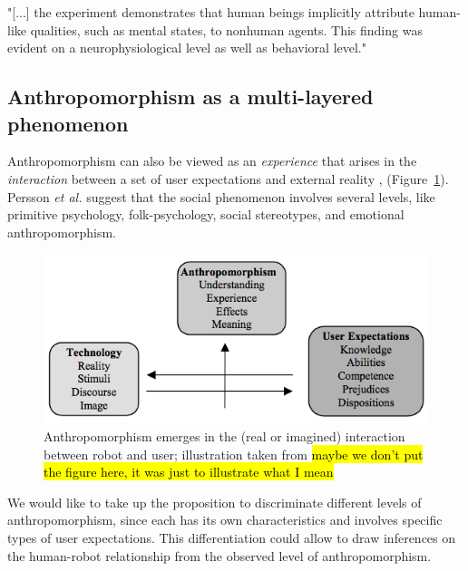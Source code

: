 \documentclass[lettersize, apacite, twoside, HRI]{apa_HRI}
\begin{document}
	

"[...] the experiment demonstrates that human beings implicitly attribute human-like qualities, such as mental states, to nonhuman agents. This finding was evident on a neurophysiological level as well as behavioral level." \cite{hegel_understanding_2008}
	


\subsection{Anthropomorphism as a multi-layered phenomenon}
\label{sec:3.4}

Anthropomorphism can also be viewed as an \textit{experience} that arises in the \textit{interaction} between a set of user expectations and external reality \cite{persson_anthropomorphism_2000}, (Figure~\ref{fig:anthropomorphism_and_interaction}). Persson \textit{et al.} suggest that the social phenomenon involves several levels, like primitive psychology, folk-psychology, social stereotypes, and emotional anthropomorphism. 

\begin{figure}[ht!]\centering
  \includegraphics[scale=0.42]{persson_anthropomorphism.png}
 \caption{Anthropomorphism emerges in the (real or imagined) interaction between robot and user; illustration taken from \cite{persson_anthropomorphism_2000} \hl{maybe we don't put the figure here, it was just to illustrate what I mean}}
 \label{fig:anthropomorphism_and_interaction}       %
 \end{figure}

We would like to take up the proposition to discriminate different levels of anthropomorphism, since each has its own characteristics and involves specific types of user expectations. This differentiation could allow to draw inferences on the human-robot relationship from the observed level of anthropomorphism.
\end{document}
